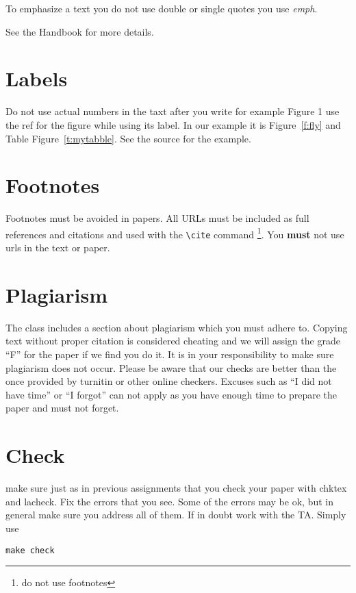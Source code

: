 To emphasize a text you do not use double or single quotes you use
\emph{emph}.

See the Handbook for more details.


\section{Labels}

Do not use actual numbers in the taxt after you write for example
Figure 1 use the ref for the figure while using its label. In our
example it is Figure~\ref{f:fly} and Table Figure~\ref{t:mytabble}.
See the source for the example.

\section{Footnotes}

Footnotes must be avoided in papers. All URLs must be included as full
references and citations and used with the \verb|\cite| command
\footnote{do not use footnotes}. You {\bf must} not use urls in the
text or paper.

\section{Plagiarism}

The class includes a section about plagiarism which you must adhere
to. Copying text without proper citation is considered cheating and we
will assign the grade ``F'' for the paper if we find you do it. It is
in your responsibility to make sure plagiarism does not occur. Please
be aware that our checks are better than the once provided by turnitin
or other online checkers. Excuses such as ``I did not have time'' or
``I forgot'' can not apply as you have enough time to prepare the
paper and must not forget. 

\section{Check}

make sure just as in previous assignments that you check your paper
with chktex and lacheck. Fix the errors that you see. Some of the
errors may be ok, but in general make sure you address all of them. If
in doubt work with the TA. Simply use

\begin{verbatim}
make check
\end{verbatim}

